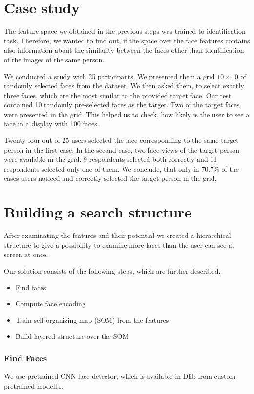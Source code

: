\section{Case study}

The feature space we obtained in the previous steps was trained to identification task. Therefore, we wanted to find out, if the space over the face features contains also information about the similarity between the faces other than identification of the images of the same person.

We conducted a study with 25 participants. We presented them a grid $10\times10$ of randomly selected faces from the dataset. We then asked them, to select exactly three faces, which are the most similar to the provided target face. Our test contained 10 randomly pre-selected faces as the target. Two of the target faces were presented in the grid. This helped us to check, how likely is the user to see a face in a display with 100 faces.

Twenty-four out of 25 users selected the face corresponding to the same target person in the first case. In the second case, two face views of the target person were available in the grid. 9 respondents selected both correctly and 11 respondents selected only one of them. We conclude, that only in 70.7\% of the cases users noticed and correctly selected the target person in the grid.




\section{Building a search structure}

After examinating the features and their potential we created a hierarchical structure to give a possibility to examine more faces than the user can see at screen at once.


Our solution consists of the following steps, which are further described.
\begin{itemize}
    \item Find faces
    \item Compute face encoding
    \item Train self-organizing map (SOM) from the features
    \item Build layered structure over the SOM
\end{itemize}

\subsubsection*{Find Faces}
We use pretrained CNN face detector, which is available in Dlib from custom pretrained modell….


